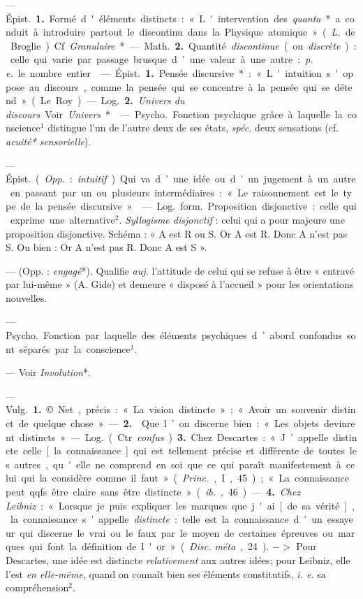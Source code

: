 \begin{itemize}[leftmargin=1cm, label=, itemsep=1pt]
 — \si{Épist.} {\bf 1.} Formé d'éléments distincts : « L'intervention
des {\it quanta}* a conduit à introduire
partout le discontinu dans la Physique atomique » ({\it L.} de Broglie).
Cf. {\it Granulaire}*.

— \si{Math.} {\bf 2.} Quantité {\it discontinue}
(ou {\it discrète}) : celle qui varie par passage brusque d’une valeur à une
autre : {\it p. e.} le nombre entier.

 — \si{Épist.} {\bf 1.} Pensée discursive* : « L'intuition s'oppose au discours, comme la pensée qui se concentre à la pensée qui se détend »
(Le Roy).

— \si{Log.} {\bf 2.} {\it Univers du discours}. Voir {\it Univers}*.

 — \si{Psycho.} Fonction
psychique grâce à laquelle la conscience$^1$ distingue l’un de l'autre
deux de ses états, {\it spéc.} deux sensations
(cf. {\it acuité* sensorielle}).

 — \si{Épist.} ({\it Opp.} : {\it intuitif}).
Qui va d’une idée ou d'un jugement
à un autre en passant par un ou plusieurs intermédiaires :
« Le raisonnement est le type de la pensée discursive. »

 — \si{Log.} \si{form.} Proposition
disjonctive : celle qui exprime une
alternative$^2$. {\it Syllogisme disjonctif} :
celui qui a pour majeure une proposition disjonctive. Schéma : « A
est R ou S. Or A est R. Donc A n'est
pas S. Ou bien : Or A n’est pas R.
Donc A est S ».

 — (Opp. : {\it engagé}*). Qualifie {\it auj.} l'attitude de
celui qui se refuse à être « entravé par lui-même » (A. Gide) et demeure «
disposé à l'accueil » pour les orientations nouvelles.

 — \si{Psycho.} Fonction par
laquelle des éléments psychiques
d’abord confondus sont séparés par
la conscience$^1$.

 — Voir {\it Involution}*.

 — \si{Vulg.} {\bf 1.} © Net, précis :
« La vision distincte » ; « Avoir un
souvenir distinct de quelque chose ».
— {\bf 2.}  Que l’on discerne bien :
« Les objets devinrent distincts ».

— \si{Log.} (Ctr. {\it confus}) {\bf 3.} Chez
Descartes : « J’appelle distincte celle
[la connaissance] qui est tellement
précise et différente de toutes les
autres, qu'elle ne comprend en soi
que ce qui paraît manifestement à
celui qui la considère comme il faut »
({\it Princ.}, I, 45); « La connaissance
peut qqfs. être claire sans être distincte » ({\it ib.}, 46). — {\bf 4.} {\it Chez Leibniz} :
« Lorsque je puis expliquer les marques que j'ai [de sa vérité], la connaissance s’appelle {\it distincte} : telle
est la connaissance d’un essayeur
qui discerne le vrai ou le faux par
le moyen de certaines épreuves ou
marques qui font la définition de
l'or » ({\it Disc. méta}, 24). $->$ Pour
Descartes, une idée est distincte
{\it relativement} aux autres idées; pour
Leibniz, elle l’est {\it en elle-même},
quand on connaît bien ses éléments
constitutifs, {\it i. e.} sa compréhension$^2$.


\end{itemize}
